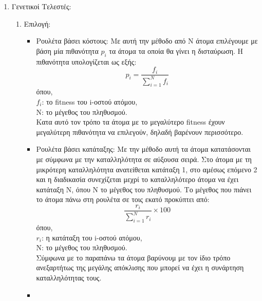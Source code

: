 \documentclass[12pt,a4paper]{article}
\newcommand{\tl}{\textlatin}
\begin{document}
\begin{enumerate}
                \item Γενετικοί Τελεστές:
                    \begin{enumerate}
                        \item Επιλογή:
                        \begin{itemize}
                                \item Ρουλέτα βάσει κόστους: Με αυτή την μέθοδο από Ν άτομα επιλέγουμε με βάση μία 
                                    πιθανότητα \tl{$p_i$} τα άτομα τα οποία θα γίνει η δισταύρωση. Η 
                                    πιθανότητα υπολογίζεται ως εξής: 
                                    $$ p_i = \frac{f_i}{\sum_{i=1}^{N}f_i}$$
                                     όπου, \\ $f_i$: το \tl{fitness} του \tl{i}-οστού ατόμου,\\
                                    Ν: το μέγεθος του πληθυσμού.
                                    \\ Κατα αυτό τον τρόπο τα άτομα με το μεγαλύτερο \tl{fitness} 
                                    έχουν μεγαλύτερη πιθανότητα να επιλεγούν, δηλαδή βαρένουν περισσότερο.
                                    \item  Ρουλέτα βάσει κατάταξης: Με την μέθοδο αυτή τα άτομα κατατάσονται με
                                        σύμφωνα με την καταλληλότητα σε αύξουσα σειρά. Στο άτομα με τη μικρότερη 
                                        καταλληλότητα ανατείθεται κατάταξη 1, στο αμέσως επόμενο 2
                                        και η διαδικασία συνεχίζεται μεχρί το
                                        καταλληλότερο άτομα να έχει κατάταξη Ν, όπου Ν το μέγεθος του πληθυσμού.
                                        Το μέγεθος που πιάνει το άτομα πάνω στη ρουλέτα σε τοις εκατό προκύπτει από:
                                        $$\frac{r_i}{\sum_{i=1}^{N}r_i}\times100$$
                                        όπου,
                                        \\ $r_i$: η κατάταξη του \tl{i}-οστού ατόμου,\\ 
                                        Ν: το μέγεθος του πληθυσμού.
                                        \\ Σύμφωνα με το παραπάνω τα άτομα βαρύνουμ με τον ίδιο τρόπο ανεξαρτήτως της
                                        μεγάλης απόκλισης που μπορεί να έχει η συνάρτηση καταλληλότητας τους.
                                    \item 
                        \end{itemize}
                    \end{enumerate}
            \end{enumerate}
\end{document}
